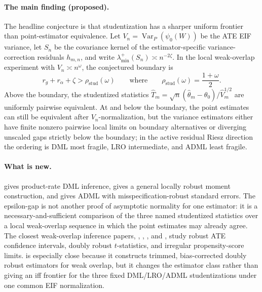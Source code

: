 \documentclass[11pt]{article}
\theoremstyle{definition}
\theoremstyle{plain}
\theoremstyle{remark}
\begin{document}
\paragraph{The main finding (proposed).}
The headline conjecture is that studentization has a sharper uniform frontier
than point-estimator equivalence.  Let \(V_n=\operatorname{Var}_P(\psi_0(W))\)
be the ATE EIF variance, let \(S_n\) be the covariance kernel of the
estimator-specific variance-correction residuals \(h_{m,n}\), and write
\(\lambda_{\min}^+(S_n)\asymp n^{-2\zeta}\).  In the local weak-overlap
experiment with \(V_n\asymp n^\omega\), the conjectured boundary is
\[
  r_g+r_\alpha+\zeta > \rho_{\mathrm{stud}}(\omega)
  \qquad\text{where}\qquad
  \rho_{\mathrm{stud}}(\omega)=\frac{1+\omega}{2}.
\]
Above the boundary, the studentized statistics
\(\widehat T_m=\sqrt n(\widehat\theta_m-\theta_0)/\widehat V_m^{1/2}\) are
uniformly pairwise equivalent.  At and below the boundary, the point estimates
can still be equivalent after \(V_n\)-normalization, but the variance
estimators either have finite nonzero pairwise local limits on boundary
alternatives or diverging unscaled gaps strictly below the boundary; in the
active residual Riesz direction the ordering is DML most fragile, LRO
intermediate, and ADML least fragile.

\paragraph{What is new.}
\citet{ChernozhukovEtAl2018DML} gives product-rate DML inference,
\citet{ChernozhukovEscancianoIchimuraNeweyRobins2022LRO} gives a general
locally robust moment construction, and
\citet{ChernozhukovNeweySingh2022ADML} gives ADML with
misspecification-robust standard errors.  The epsilon-gap is not another proof
of asymptotic normality for one estimator: it is a necessary-and-sufficient
comparison of the three named studentized statistics over a local weak-overlap
sequence in which the point estimates may already agree.  The closest
weak-overlap inference papers, \citet{Dorn2025WeakOverlapTStats},
\citet{Rothe2017LimitedOverlapCI}, \citet{ArmstrongKolesar2021ATE}, and
\citet{HeilerKazak2021ExtremePS}, study robust ATE confidence intervals,
doubly robust \(t\)-statistics, and irregular propensity-score limits.
\citet{MaSantAnnaSasakiUra2026WeakOverlapDR} is especially close because it
constructs trimmed, bias-corrected doubly robust estimators for weak overlap,
but it changes the estimator class rather than giving an iff frontier for the
three fixed DML/LRO/ADML studentizations under one common EIF normalization.
\end{document}
